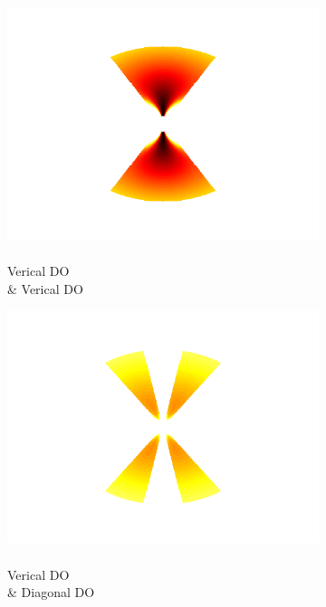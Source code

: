 \documentclass[journal,onecolumn]{IEEEtran}
\begin{document}
\begin{figure}[h] \label{fig:bowtie-excite-maps}
    \centering
    \begin{subfigure}[b]{0.2\textwidth}
            \centering
            \captionsetup{justification=centering}
            \includegraphics[width=.85\linewidth]{map-j_1_1}
            \caption{\\ Verical DO \\ \& Verical DO}
    \end{subfigure}%
    \begin{subfigure}[b]{0.2\textwidth}
            \centering
            \captionsetup{justification=centering}
            \includegraphics[width=.85\linewidth]{map-j_1_2}
            \caption{\\ Verical DO \\ \& Diagonal DO}
    \end{subfigure}%
    \begin{subfigure}[b]{0.2\textwidth}

\end{subfigure}
\end{figure}
\end{document}
